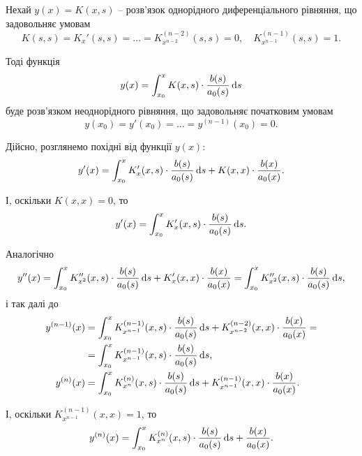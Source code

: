 Нехай $y(x) = K(x, s)$ -- розв’язок однорідного диференціального рівняння, що задовольняє умовам
\begin{equation*}
	K(s, s) = K_x'(s, s) = \ldots = K_{x^{n - 2}}^{(n - 2)}(s, s) = 0, \quad K_{x^{n - 1}}^{(n - 1)}(s, s) = 1.
\end{equation*}

Тоді функція
\begin{equation*}
	y(x) = \int_{x_0}^x K(x, s) \cdot \frac{b(s)}{a_0(s)} \mathop{}\!\mathrm{d} s
\end{equation*}
буде розв’язком неоднорідного рівняння, що задовольняє початковим умовам
\begin{equation*}
	y(x_0) = y'(x_0) = \ldots = y^{(n - 1)}(x_0) = 0.
\end{equation*}

Дійсно, розглянемо похідні від функції $y(x)$:
\begin{equation*}
	y'(x) = \int_{x_0}^x K_x'(x, s) \cdot \frac{b(s)}{a_0(s)} \mathop{}\!\mathrm{d} s + K(x, x) \cdot \frac{b(x)}{a_0(x)}.
\end{equation*}

І, оскільки $K(x, x) = 0$, то
\begin{equation*}
	y'(x) = \int_{x_0}^x K_x'(x, s) \cdot \frac{b(s)}{a_0(s)} \mathop{}\!\mathrm{d} s.
\end{equation*}

Аналогічно
\begin{equation*}
	y''(x) = \int_{x_0}^x K_{x^2}''(x, s) \cdot \frac{b(s)}{a_0(s)} \mathop{}\!\mathrm{d} s + K_x'(x, x) \cdot \frac{b(x)}{a_0(x)} = \int_{x_0}^x K_{x^2}''(x, s) \cdot \frac{b(s)}{a_0(s)} \mathop{}\!\mathrm{d} s,
\end{equation*}
і так далі до
\begin{align*}
	y^{(n - 1)}(x) &= \int_{x_0}^x K_{x^{n - 1}}^{(n - 1)}(x, s) \cdot \frac{b(s)}{a_0(s)} \mathop{}\!\mathrm{d} s + K_{x^{n - 2}}^{(n - 2)}(x, x) \cdot \frac{b(x)}{a_0(x)} = \\ &= \int_{x_0}^x K_{x^{n - 1}}^{(n - 1)}(x, s) \cdot \frac{b(s)}{a_0(s)} \mathop{}\!\mathrm{d} s, \\
	y^{(n)}(x) &= \int_{x_0}^x K_{x^n}^{(n)}(x, s) \cdot \frac{b(s)}{a_0(s)} \mathop{}\!\mathrm{d} s + K_{x^{n - 1}}^{(n - 1)}(x, x) \cdot \frac{b(x)}{a_0(x)}.
\end{align*}

І, оскільки $K_{x^{n - 1}}^{(n - 1)}(x, x) = 1$, то
\begin{equation*}
	y^{(n)}(x) = \int_{x_0}^x K_{x^n}^{(n)}(x, s) \cdot \frac{b(s)}{a_0(s)} \mathop{}\!\mathrm{d} s + \frac{b(x)}{a_0(x)}.
\end{equation*}

